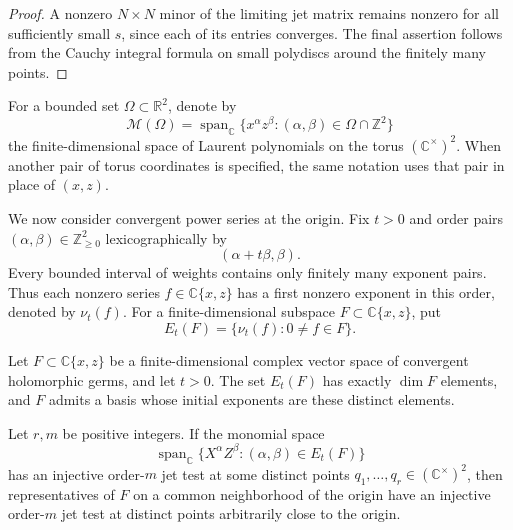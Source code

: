 \begin{proof}
A nonzero $N\times N$ minor of the limiting jet matrix remains nonzero for all sufficiently small $s$, since each of its entries converges. The final assertion follows from the Cauchy integral formula on small polydiscs around the finitely many points.
\end{proof}

For a bounded set $\Omega\subset\mathbb{R}^2$, denote by
\[
 \mathcal{M}(\Omega)
 =\operatorname{span}_{\mathbb{C}}\{x^\alpha z^\beta:
                 (\alpha,\beta)\in\Omega\cap\mathbb{Z}^2\}
\]
the finite-dimensional space of Laurent polynomials on the torus $(\mathbb{C}^\times)^2$.  When another pair of torus coordinates is specified, the same notation uses that pair in place of $(x,z)$.

We now consider convergent power series at the origin.  Fix $t>0$ and order pairs $(\alpha,\beta)\in\mathbb{Z}_{\ge0}^2$ lexicographically by
\[
 (\alpha+t\beta,\beta).
\]
Every bounded interval of weights contains only finitely many exponent pairs.  Thus each nonzero series $f\in\mathbb{C}\{x,z\}$ has a first nonzero exponent in this order, denoted by $\nu_t(f)$.  For a finite-dimensional subspace $F\subset\mathbb{C}\{x,z\}$, put
\[
 E_t(F)=\{\nu_t(f):0\ne f\in F\}.
\]

\begin{proposition}
\label{prop:initial-transfer}
Let $F\subset\mathbb{C}\{x,z\}$ be a finite-dimensional complex vector space of convergent holomorphic germs, and let $t>0$.  The set $E_t(F)$ has exactly $\dim F$ elements, and $F$ admits a basis whose initial exponents are these distinct elements.

Let $r,m$ be positive integers.  If the monomial space
\[
 \operatorname{span}_{\mathbb{C}}\{X^\alpha Z^\beta:(\alpha,\beta)\in E_t(F)\}
\]
has an injective order-$m$ jet test at some distinct points $q_1,\ldots,q_r\in(\mathbb{C}^\times)^2$, then representatives of $F$ on a common neighborhood of the origin have an injective order-$m$ jet test at distinct points arbitrarily close to the origin.
\end{proposition}

